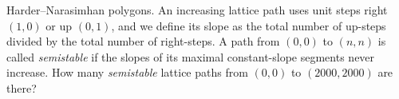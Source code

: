 \begin{problem}{Harder–Narasimhan polygons.}
    An increasing lattice path uses unit steps right \((1,0)\) or up \((0,1)\), and we define its slope as the total number of up-steps divided by the total number of right-steps. A path from \((0,0)\) to \((n,n)\) is called \textit{semistable} if the slopes of its maximal constant-slope segments never increase.
    How many \textit{semistable} lattice paths from \((0,0)\) to \((2000,2000)\) are there?
    
\end{problem}
